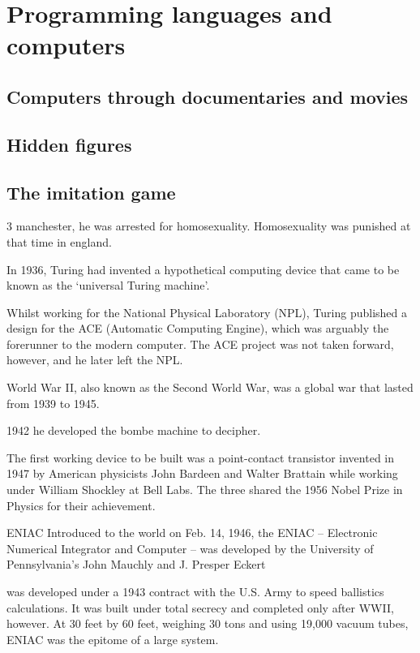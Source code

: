 
 

\chapter{Programming languages and computers} 
   
   \section{Computers through documentaries and movies} 
      
 \section{Hidden figures} 
 
 
  \section{The imitation game} 
  
  3 manchester, he was arrested for homosexuality. Homosexuality was punished at that time in england. 
  
  In 1936, Turing had invented a hypothetical computing device that came to be known as the ‘universal Turing machine’. 
  
  Whilst working for the National Physical Laboratory (NPL), Turing published a design for the ACE (Automatic Computing Engine), which was 
  arguably the forerunner to the modern computer. The ACE project was not taken forward, however, and he later left the NPL.
  
   World War II, also known as the Second World War, was a global war that lasted from 1939 to 1945.
  
  1942 he developed the bombe machine to decipher. 
  
  
  The first working device to be built was a point-contact transistor invented in 1947 by American physicists John Bardeen and Walter 
  Brattain 
  while working under William Shockley at Bell Labs. The three shared the 1956 Nobel Prize in Physics for their achievement.
  
  ENIAC Introduced to the world on Feb. 14, 1946, the ENIAC -- Electronic Numerical Integrator and Computer -- was developed by the 
  University 
  of Pennsylvania's John Mauchly and J. Presper Eckert 
  
  was developed under a 1943 contract with the U.S. Army to speed ballistics calculations. It was built under total secrecy and completed 
  only 
  after WWII, however. At 30 feet by 60 feet, weighing 30 tons and using 19,000 vacuum tubes, ENIAC was the epitome of a large system.
  
